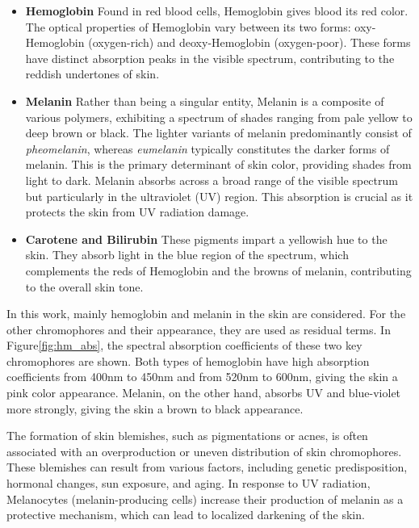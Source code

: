 \begin{spacing}{1.5}
\begin{itemize}
    \item \textbf{Hemoglobin} Found in red blood cells, Hemoglobin gives blood its red color. The optical properties of Hemoglobin vary between its two forms: oxy-Hemoglobin (oxygen-rich) and deoxy-Hemoglobin (oxygen-poor). These forms have distinct absorption peaks in the visible spectrum, contributing to the reddish undertones of skin.
    \item \textbf{Melanin} Rather than being a singular entity, Melanin is a composite of various polymers, exhibiting a spectrum of shades ranging from pale yellow to deep brown or black. The lighter variants of melanin predominantly consist of \textit{pheomelanin}, whereas \textit{eumelanin} typically constitutes the darker forms of melanin\cite{alalufEthnicVariationMelanin2002a}. This is the primary determinant of skin color\cite{doiSpectralEstimationHuman2003}, providing shades from light to dark. Melanin absorbs across a broad range of the visible spectrum but particularly in the ultraviolet (UV) region\cite{ANDERSON198113}. This absorption is crucial as it protects the skin from UV radiation damage. 
    \item \textbf{Carotene and Bilirubin} These pigments impart a yellowish hue to the skin. They absorb light in the blue region of the spectrum, which complements the reds of Hemoglobin and the browns of melanin, contributing to the overall skin tone\cite{ANDERSON198113}.
\end{itemize}


In this work, mainly hemoglobin and melanin in the skin are considered. For the other chromophores and their appearance, they are used as residual terms. In Figure\ref{fig:hm_abs}, the spectral absorption coefficients of these two key chromophores are shown. Both types of hemoglobin have high absorption coefficients from 400nm to 450nm and from 520nm to 600nm, giving the skin a pink color appearance. Melanin, on the other hand, absorbs UV and blue-violet more strongly, giving the skin a brown to black appearance.

The formation of skin blemishes, such as pigmentations or acnes, is often associated with an overproduction or uneven distribution of skin chromophores. These blemishes can result from various factors, including genetic predisposition, hormonal changes, sun exposure, and aging. In response to UV radiation, Melanocytes (melanin-producing cells) increase their production of melanin as a protective mechanism, which can lead to localized darkening of the skin.


\end{spacing}
